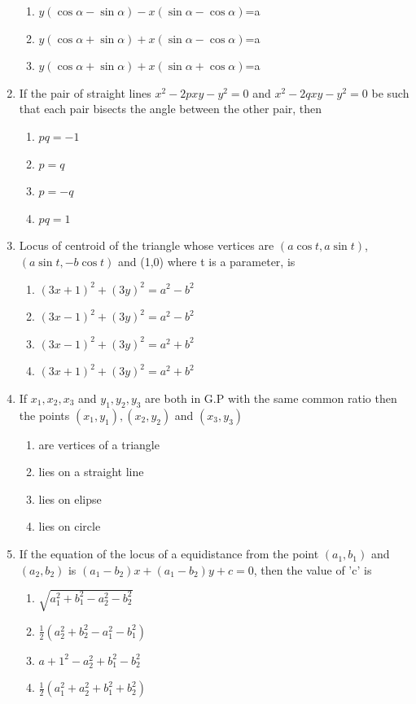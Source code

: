 \documentclass[12pt]{article}
\begin{document}
\begin{enumerate}
\begin{enumerate}
\item $y(\cos\alpha-\sin\alpha)-x(\sin\alpha-\cos\alpha)$=a
\item $y(\cos\alpha+\sin\alpha)+x(\sin\alpha-\cos\alpha)$=a
\item $y(\cos\alpha+\sin\alpha)+x(\sin\alpha+\cos\alpha)$=a
\end{enumerate}
\item If the pair of straight lines $x^2-2pxy-y^2=0$ and $x^2-2qxy-y^2=0$ be such that each pair bisects the angle between the other pair, then 
\begin{enumerate}
\item $pq=-1$  
\item $p=q$ 
\item $p=-q$  
\item $pq=1$
\end{enumerate}
\item Locus of centroid of the triangle whose vertices are $(a\cos t, a\sin t)$, $(a\sin t,-b\cos t)$ and (1,0) where t is a parameter, is 
\begin{enumerate}
\item$(3x+1)^2+(3y)^2=a^2-b^2$
\item $(3x-1)^2+(3y)^2=a^2-b^2$
\item $(3x-1)^2+(3y)^2=a^2+b^2$
\item $(3x+1)^2+(3y)^2=a^2+b^2$
\end{enumerate}
\item If $x_1,x_2,x_3$ and $y_1,y_2,y_3$ are both in G.P with the same common ratio then the points $(x_1,y_1),(x_2,y_2)$ and $(x_3,y_3)$
\begin{enumerate}
\item are vertices of a triangle
\item lies on a straight line
\item lies on elipse
\item lies on circle
\end{enumerate}
\item If the equation of the locus of a equidistance from the point $(a_1,b_1)$ and $(a_2,b_2)$ is $(a_1-b_2)x+(a_1-b_2)y+c=0$, then the value of 'c' is
\begin{enumerate}
\item $\sqrt{a_1^2+b_1^2-a_2^2-b_2^2}$
\item $\frac{1}{2}(a_2^2+b_2^2-a_1^2-b_1^2)$
\item $a+1^2-a_2^2+b_1^2-b_2^2$
\item $\frac{1}{2}(a_1^2+a_2^2+b_1^2+b_2^2)$
\end{enumerate}

\end{enumerate}
\end{document}

